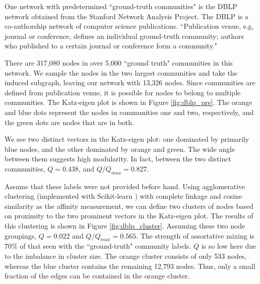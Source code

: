 \documentclass{IEEEtran}
\begin{document}
	One network with predetermined ``ground-truth communities" is the DBLP network\cite{DBLP} obtained from the Stanford Network Analysis Project\cite{SNAP}. The DBLP is a co-authorship network of computer science publications. ``Publication venue, e.g, journal or conference, defines an individual ground-truth community; authors who published to a certain journal or conference form a community."
	
	There are 317,080 nodes in over 5,000 ``ground truth" communities in this network. We sample the nodes in the two largest communities and take the induced subgraph, leaving our network with 13,326 nodes. Since communities are defined from publication venue, it is possible for nodes to belong to multiple communities. The Katz-eigen plot is shown in Figure \ref{fig:dblp_pre}. The orange and blue dots represent the nodes in communities one and two, respectively, and the green dots are nodes that are in both.
	
	We see two distinct vectors in the Katz-eigen plot: one dominated by primarily blue nodes, and the other dominated by orange and green. The wide angle between them suggests high modularity. In fact, between the two distinct communities, $Q=0.438$, and $Q/Q_{max} = 0.827$.
	
	Assume that these labels were not provided before hand. Using agglomerative clustering (implemented with Scikit-learn \cite{scikit-learn}) with complete linkage and cosine similarity as the affinity measurement, we can define two clusters of nodes based on proximity to the two prominent vectors in the Katz-eigen plot. The results of this clustering is shown in Figure \ref{fig:dblp_cluster}. Assuming these two node groupings, $Q=0.022$ and $Q/Q_{max}=0.565$. The strength of assortative mixing is 70\% of that seen with the ``ground-truth" community labels. $Q$ is so low here due to the imbalance in cluster size. The orange cluster consists of only 533 nodes, whereas the blue cluster contains the remaining 12,793 nodes. Thus, only a small fraction of the edges can be contained in the orange cluster.
	
	
\end{document}
